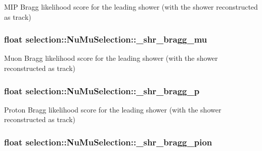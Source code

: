 M\-I\-P Bragg likelihood score for the leading shower (with the shower reconstructed as track) \hypertarget{classselection_1_1NuMuSelection_aea36ed7e354b16fc1e5ff97cedb23c47}{
\subsubsection[{\-\_\-shr\-\_\-bragg\-\_\-mu}]{\setlength{\rightskip}{0pt plus 5cm}float selection\-::\-Nu\-Mu\-Selection\-::\-\_\-shr\-\_\-bragg\-\_\-mu\hspace{0.3cm}{\ttfamily [private]}}}\label{classselection_1_1NuMuSelection_aea36ed7e354b16fc1e5ff97cedb23c47}
Muon Bragg likelihood score for the leading shower (with the shower reconstructed as track) \hypertarget{classselection_1_1NuMuSelection_af7b55d564aef645da1ff8a1fa0b4e620}{
\subsubsection[{\-\_\-shr\-\_\-bragg\-\_\-p}]{\setlength{\rightskip}{0pt plus 5cm}float selection\-::\-Nu\-Mu\-Selection\-::\-\_\-shr\-\_\-bragg\-\_\-p\hspace{0.3cm}{\ttfamily [private]}}}\label{classselection_1_1NuMuSelection_af7b55d564aef645da1ff8a1fa0b4e620}
Proton Bragg likelihood score for the leading shower (with the shower reconstructed as track) \hypertarget{classselection_1_1NuMuSelection_a965ff03e4cd45fa4a7267f2c4576c99e}{
\subsubsection[{\-\_\-shr\-\_\-bragg\-\_\-pion}]{\setlength{\rightskip}{0pt plus 5cm}float selection\-::\-Nu\-Mu\-Selection\-::\-\_\-shr\-\_\-bragg\-\_\-pion\hspace{0.3cm}{\ttfamily [private]}}}\label{classselection_1_1NuMuSelection_a965ff03e4cd45fa4a7267f2c4576c99e}
